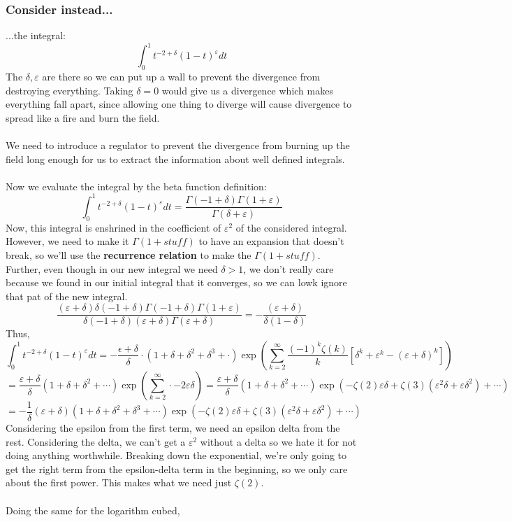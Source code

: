 \documentclass{article}
\begin{document}
\subsubsection{Consider instead...}
...the integral:
\[\int_{0}^{1} t^{-2+\delta}(1-t)^{\varepsilon}dt\]
The $\delta, \varepsilon$ are there so we can put up a wall to prevent the divergence from destroying everything. Taking $\delta = 0$ would give us a divergence which makes everything fall apart, since allowing one thing to diverge will cause divergence to spread like a fire and burn the field.
\\\\We need to introduce a regulator to prevent the divergence from burning up the field long enough for us to extract the information about well defined integrals.
\\\\Now we evaluate the integral by the beta function definition: 
\[\int_{0}^{1} t^{-2+\delta}(1-t)^{\varepsilon}dt = \frac{\Gamma(-1+\delta)\Gamma(1+\varepsilon)}{\Gamma(\delta + \varepsilon)}\]
Now, this integral is enshrined in the coefficient of $\varepsilon^2$ of the considered integral. However, we need to make it $\Gamma(1+stuff)$ to have an expansion that doesn't break, so we'll use the \textbf{recurrence relation} to make the $\Gamma(1+stuff)$. Further, even though in our new integral we need $\delta > 1$, we don't really care because we found in our initial integral that it converges, so we can lowk ignore that pat of the new integral.
\[\frac{(\varepsilon + \delta)\delta(-1+\delta)\Gamma(-1+\delta)\Gamma(1+\varepsilon)}{\delta(-1+\delta)(\varepsilon + \delta)\Gamma(\varepsilon+\delta)} = -\frac{(\varepsilon + \delta)}{\delta(1-\delta)}\]
Thus, 
\[\int_{0}^{1}t^{-2+\delta}(1-t)^{\varepsilon}dt = -\frac{\epsilon + \delta}{\delta} \cdot (1 + \delta + \delta^2 + \delta^3 + \cdot) \exp(\sum_{k=2}^{\infty}\frac{(-1)^k\zeta(k)}{k}\left[ \delta^k + \varepsilon^k - (\varepsilon + \delta)^k\right])\]
\[ =  \frac{\varepsilon + \delta}{\delta} (1+\delta + \delta^2 + \cdots)\exp(\sum_{k=2}^{\infty} \cdot -2\varepsilon\delta) = \frac{\varepsilon + \delta}{\delta} (1+\delta + \delta^2 + \cdots)\exp(-\zeta(2)\varepsilon\delta + \zeta(3)(\varepsilon^2\delta + \varepsilon\delta^2) + \cdots)\]
\[= -\frac{1}{\delta} (\varepsilon + \delta) (1+\delta + \delta^2 + \delta^3 + \cdots) \exp(-\zeta(2)\varepsilon\delta + \zeta(3)(\varepsilon^2\delta + \varepsilon\delta^2) + \cdots)\]
Considering the epsilon from the first term, we need an epsilon delta from the rest. Considering the delta, we can't get a $\varepsilon^2$ without a delta so we hate it for not doing anything worthwhile. Breaking down the exponential, we're only going to get the right term from the epsilon-delta term in the beginning, so we only care about the first power. This makes what we need just $\zeta(2)$.
\\\\
Doing the same for the logarithm cubed, 
\end{document}

